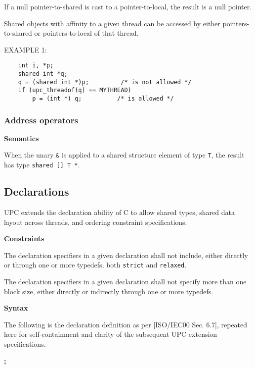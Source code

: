 \np If a null pointer-to-shared is cast to a pointer-to-local,
     the result is a null pointer.    
       
\np Shared objects with affinity to a given thread can be
    accessed by either pointers-to-shared or pointers-to-local of
    that thread.

\np EXAMPLE 1: 
\begin{verbatim}
    int i, *p; 
    shared int *q; 
    q = (shared int *)p;         /* is not allowed */ 
    if (upc_threadof(q) == MYTHREAD)
        p = (int *) q;          /* is allowed */ 
\end{verbatim}

\subsubsection{Address operators}

{\bf Semantics} 

\npf When the unary {\tt \&} is applied to a shared structure
    element of type {\tt T}, the result has type {\tt shared [] T *}.

\subsection{Declarations}

\npf UPC extends the declaration ability of C to allow shared
     types, shared data layout across threads, and ordering constraint
     specifications.

{\bf Constraints} 

\np The declaration specifiers in a given declaration shall
     not include, either directly or through one or more typedefs,
     both {\tt strict} and {\tt relaxed}.

 
\np The declaration specifiers in a given declaration shall
     not specify more than one block size, either directly or
     indirectly through one or more typedefs.

{\bf Syntax} 

\np The following is the declaration definition as per
    [ISO/IEC00 Sec. 6.7], repeated here for self-containment and
    clarity of the subsequent UPC extension specifications.


 {\bf ;}

